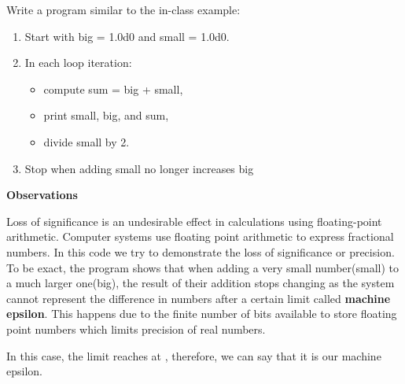 \documentclass{homework}
\begin{document}
\question
Write a program similar to the in-class example:
\begin{enumerate}
    \item Start with big = 1.0d0 and small = 1.0d0.
    \item In each loop iteration:
    \begin{itemize}
         \item compute sum = big + small,
         \item print small, big, and sum,
         \item divide small by 2.

    \end{itemize}
    \item Stop when adding small no longer increases big
\end{enumerate}


\hfill\break

\begin{sol}


{\large \textbf{Observations}}
\hfill


Loss of significance is an undesirable effect in calculations using floating-point arithmetic. Computer systems use floating point arithmetic to express fractional numbers. 
In this code we try to demonstrate the loss of significance or precision. To be exact, the program shows that when adding a very small number(small) to a much larger one(big), the result of their addition stops changing as the system cannot represent the difference in numbers after a certain limit called \textbf{machine epsilon}. This happens due to the finite number of bits available to store floating point numbers which limits precision of real numbers. 

In this case, the limit reaches at , therefore, we can say that it is our machine epsilon. 
\vfill






\end{sol}
\end{document}
